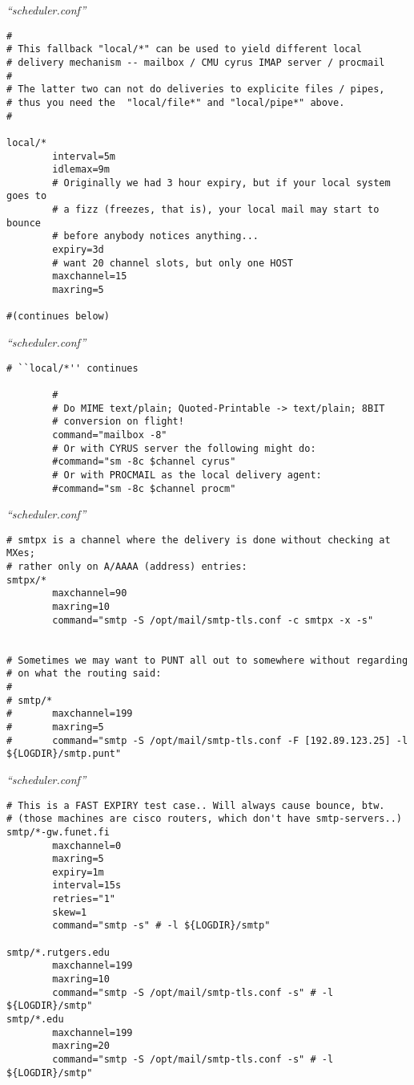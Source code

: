 \documentclass[a4paper,landscape]{slides}
\begin{document}
\begin{overlay}
\small
\centerline{{\it ``scheduler.conf''}}
\tiny
\begin{verbatim}
#
# This fallback "local/*" can be used to yield different local
# delivery mechanism -- mailbox / CMU cyrus IMAP server / procmail
#
# The latter two can not do deliveries to explicite files / pipes,
# thus you need the  "local/file*" and "local/pipe*" above.
#

local/*
        interval=5m
        idlemax=9m
        # Originally we had 3 hour expiry, but if your local system goes to
        # a fizz (freezes, that is), your local mail may start to bounce
        # before anybody notices anything...
        expiry=3d
        # want 20 channel slots, but only one HOST
        maxchannel=15
        maxring=5

#(continues below)
\end{verbatim}
\vfill
\end{overlay}
\begin{overlay}
\small
\centerline{{\it ``scheduler.conf''}}
\tiny
\begin{verbatim}
# ``local/*'' continues

        #
        # Do MIME text/plain; Quoted-Printable -> text/plain; 8BIT
        # conversion on flight!
        command="mailbox -8"
        # Or with CYRUS server the following might do:
        #command="sm -8c $channel cyrus"
        # Or with PROCMAIL as the local delivery agent:
        #command="sm -8c $channel procm"
\end{verbatim}
\vfill
\end{overlay}
\begin{overlay}
\small
\centerline{{\it ``scheduler.conf''}}
\tiny
\begin{verbatim}
# smtpx is a channel where the delivery is done without checking at MXes;
# rather only on A/AAAA (address) entries:
smtpx/*
        maxchannel=90
        maxring=10
        command="smtp -S /opt/mail/smtp-tls.conf -c smtpx -x -s"


# Sometimes we may want to PUNT all out to somewhere without regarding
# on what the routing said:
#
# smtp/*
#       maxchannel=199
#       maxring=5
#       command="smtp -S /opt/mail/smtp-tls.conf -F [192.89.123.25] -l ${LOGDIR}/smtp.punt"
\end{verbatim}
\vfill
\end{overlay}
\begin{overlay}
\small
\centerline{{\it ``scheduler.conf''}}
\tiny
\begin{verbatim}
# This is a FAST EXPIRY test case.. Will always cause bounce, btw.
# (those machines are cisco routers, which don't have smtp-servers..)
smtp/*-gw.funet.fi
        maxchannel=0
        maxring=5
        expiry=1m
        interval=15s
        retries="1"
        skew=1
        command="smtp -s" # -l ${LOGDIR}/smtp"

smtp/*.rutgers.edu
        maxchannel=199
        maxring=10
        command="smtp -S /opt/mail/smtp-tls.conf -s" # -l ${LOGDIR}/smtp"
smtp/*.edu
        maxchannel=199
        maxring=20
        command="smtp -S /opt/mail/smtp-tls.conf -s" # -l ${LOGDIR}/smtp"
\end{verbatim}
\vfill
\end{overlay}
\end{document}
